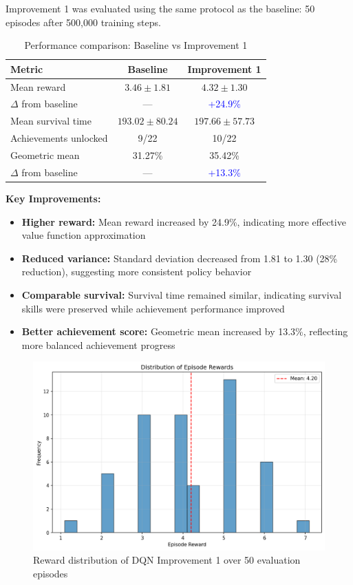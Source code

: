 \documentclass[twocolumn]{article}
\begin{document}
Improvement 1 was evaluated using the same protocol as the baseline: 50 episodes after 500,000 training steps.

\begin{table}[H]
\centering
\begin{tabular}{lcc}
\toprule
\textbf{Metric} & \textbf{Baseline} & \textbf{Improvement 1} \\
\midrule
Mean reward & $3.46 \pm 1.81$ & $4.32 \pm 1.30$ \\
$\Delta$ from baseline & --- & \textcolor{blue}{+24.9\%} \\
Mean survival time & $193.02 \pm 80.24$ & $197.66 \pm 57.73$ \\
Achievements unlocked & 9/22 & 10/22 \\
Geometric mean & 31.27\% & 35.42\% \\
$\Delta$ from baseline & --- & \textcolor{blue}{+13.3\%} \\
\bottomrule
\end{tabular}
\caption{Performance comparison: Baseline vs Improvement 1}
\end{table}

\textbf{Key Improvements:}

\begin{itemize}
    \item \textbf{Higher reward:} Mean reward increased by 24.9\%, indicating more effective value function approximation
    \item \textbf{Reduced variance:} Standard deviation decreased from 1.81 to 1.30 (28\% reduction), suggesting more consistent policy behavior
    \item \textbf{Comparable survival:} Survival time remained similar, indicating survival skills were preserved while achievement performance improved
    \item \textbf{Better achievement score:} Geometric mean increased by 13.3\%, reflecting more balanced achievement progress
\end{itemize}

\begin{figure}[H]
    \centering
    \includegraphics[width=0.8\linewidth]{images/DQNImprov1reward_distribution.png}
    \caption{Reward distribution of DQN Improvement 1 over 50 evaluation episodes}
    \label{fig:dqn_improv1_reward}
\end{figure}
\end{document}
